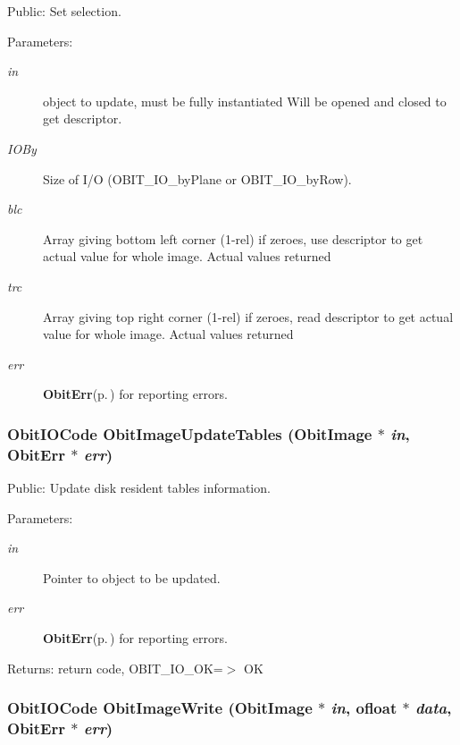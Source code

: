 Public: Set selection. 

\begin{Desc}
\item[Parameters:]
\begin{description}
\item[{\em in}]object to update, must be fully instantiated Will be opened and closed to get descriptor. \item[{\em IOBy}]Size of I/O (OBIT\_\-IO\_\-by\-Plane or OBIT\_\-IO\_\-by\-Row). \item[{\em blc}]Array giving bottom left corner (1-rel) if zeroes, use descriptor to get actual value for whole image. Actual values returned \item[{\em trc}]Array giving top right corner (1-rel) if zeroes, read descriptor to get actual value for whole image. Actual values returned \item[{\em err}]{\bf Obit\-Err}{\rm (p.\,\pageref{structObitErr})} for reporting errors. \end{description}
\end{Desc}
\subsubsection{\setlength{\rightskip}{0pt plus 5cm}Obit\-IOCode Obit\-Image\-Update\-Tables ({\bf Obit\-Image} $\ast$ {\em in}, {\bf Obit\-Err} $\ast$ {\em err})}\label{ObitImage_8c_a30}


Public: Update disk resident tables information. 

\begin{Desc}
\item[Parameters:]
\begin{description}
\item[{\em in}]Pointer to object to be updated. \item[{\em err}]{\bf Obit\-Err}{\rm (p.\,\pageref{structObitErr})} for reporting errors. \end{description}
\end{Desc}
\begin{Desc}
\item[Returns:]return code, OBIT\_\-IO\_\-OK=$>$ OK \end{Desc}
\subsubsection{\setlength{\rightskip}{0pt plus 5cm}Obit\-IOCode Obit\-Image\-Write ({\bf Obit\-Image} $\ast$ {\em in}, {\bf ofloat} $\ast$ {\em data}, {\bf Obit\-Err} $\ast$ {\em err})}\label{ObitImage_8c_a24}


